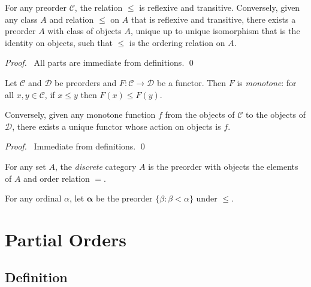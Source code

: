 \begin{prop}
For any preorder $\mathcal{C}$, the relation $\leq$ is reflexive and transitive. Conversely, given any class $A$ and relation $\leq$ on $A$ that is reflexive and transitive, there exists a preorder $A$ with class of objects $A$, unique up to unique isomorphism that is the identity on objects, such that $\leq$ is the ordering relation on $A$.
\end{prop}

\begin{proof}
\pf\ All parts are immediate from definitions. \qed
\end{proof}

\begin{prop}
Let $\mathcal{C}$ and $\mathcal{D}$ be preorders and $F : \mathcal{C} \rightarrow \mathcal{D}$ be a functor. Then $F$ is \emph{monotone}: for all $x,y \in \mathcal{C}$, if $x \leq y$ then $F(x) \leq F(y)$.

Conversely, given any monotone function $f$ from the objects of $\mathcal{C}$ to the objects of $\mathcal{D}$, there exists a unique functor whose action on objects is $f$.
\end{prop}

\begin{proof}
\pf\ Immediate from definitions. \qed
\end{proof}

\begin{ex}
For any set $A$, the \emph{discrete} category $A$ is the preorder with objects the elements of $A$ and order relation $=$.
\end{ex}

\begin{ex}
For any ordinal $\alpha$, let $\mathbf{\alpha}$ be the preorder $\{ \beta : \beta < \alpha \}$ under $\leq$.
\end{ex}




\section{Partial Orders}

\subsection{Definition}


